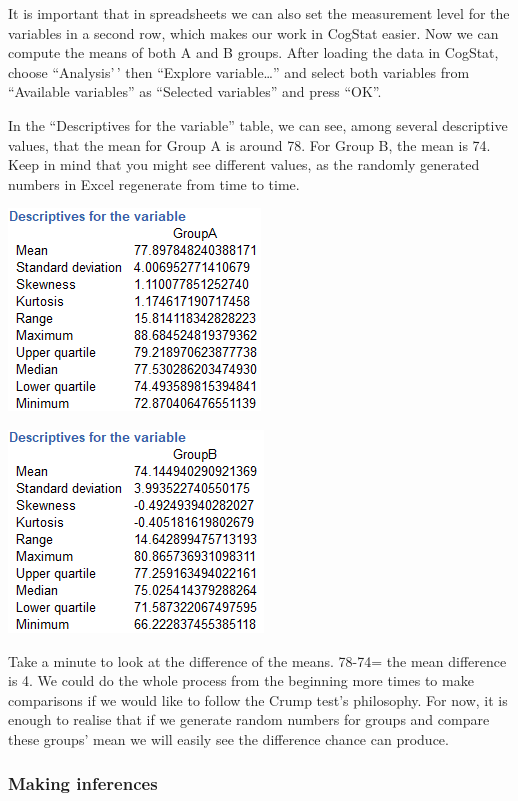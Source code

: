 \documentclass[
]{book}
\begin{document}
It is important that in spreadsheets we can also set the measurement level for the variables in a second row, which makes our work in CogStat easier. Now we can compute the means of both A and B groups. After loading the data in CogStat, choose ``Analysis'\,' then ``Explore variable\ldots{}'' and select both variables from ``Available variables'' as ``Selected variables'' and press ``OK''.

In the ``Descriptives for the variable'' table, we can see, among several descriptive values, that the mean for Group A is around 78. For Group B, the mean is 74. Keep in mind that you might see different values, as the randomly generated numbers in Excel regenerate from time to time.

\includegraphics{img/ch5/5.3.2groupAdescr.png}

\includegraphics{img/ch5/5.3.2groupBdescr.png}

Take a minute to look at the difference of the means. 78-74= the mean difference is 4. We could do the whole process from the beginning more times to make comparisons if we would like to follow the Crump test's philosophy. For now, it is enough to realise that if we generate random numbers for groups and compare these groups' mean we will easily see the difference chance can produce.

\hypertarget{making-inferences}{%
\subsubsection{Making inferences}\label{making-inferences}}
\end{document}
